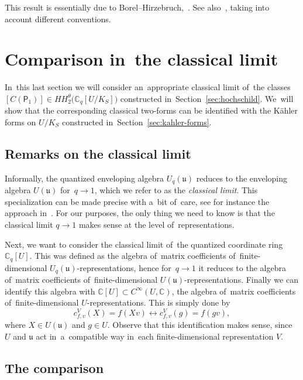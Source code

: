 \documentclass[pdftex]{sigma}
\numberwithin{equation}{section}
\newcommand{\lieu}{\mathfrak{u}}
\newcommand{\CU}{\mathbb{C}[U]}
\newcommand{\Uqu}{U_q(\mathfrak{u})}
\newcommand{\CqU}{\mathbb{C}_q[U]}
\newcommand{\Cqflag}{\mathbb{C}_q[U / K_S]}
\newcommand{\bbC}{\mathbb{C}}
\newcommand{\proj}{\mathsf{P}}
\begin{document}
\begin{Remark}
This result is essentially due to Borel--Hirzebruch,~\cite[Proposition~14.6]{bo-hi}.
See also~\cite[Theorem~7.5]{snow}, taking into account different conventions.
\end{Remark}

\section{Comparison in~the classical limit}
\label{sec:comparison}

In~this last section we will consider an~appropriate classical limit of~the classes $[C(\proj_1)] \in HH^\theta_2\big(\Cqflag\big)$ constructed in~Section~\ref{sec:hochschild}.
We~will show that the corresponding classical two-forms can be identified with the K\"ahler forms on $U / K_S$ constructed in~Section~\ref{sec:kahler-forms}.

\subsection{Remarks on the classical limit}

Informally, the quantized enveloping algebra $\Uqu$ reduces to the enveloping algebra $U(\lieu)$ for~$q \to 1$, which we refer to as the \emph{classical limit}.
This specialization can be made precise with a~bit of~care, see for instance the approach in~\cite[Section~3.4]{hong-kang}.
For our purposes, the only thing we need to know is that the classical limit $q \to 1$ makes sense at the level of~representations.

Next, we want to consider the classical limit of~the quantized coordinate ring $\CqU$.
This was defined as the algebra of~matrix coefficients of~finite-dimensional $\Uqu$-repre\-sentations, hence for~$q \to 1$ it reduces to the algebra of~matrix coefficients of~finite-dimensional \mbox{$U(\lieu)$-repre}\-sentations.
Finally we can identify this algebra with $\CU \subset C^\infty(U, \bbC)$, the algebra of~mat\-rix coefficients of~finite-dimensional $U$-representations.
This is simply done by
\[
c^V_{f, v}(X) = f(X v) \longleftrightarrow c^V_{f, v}(g) = f(g v),
\]
where $X \in U(\lieu)$ and $g \in U$.
Observe that this identification makes sense, since $U$ and $\lieu$ act in~a~compatible way in~each finite-dimensional representation $V$.

\subsection{The comparison}
\end{document}
